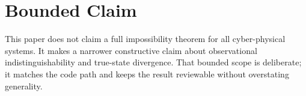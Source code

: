 \documentclass[conference]{IEEEtran}
\begin{document}
\section{Bounded Claim}
This paper does not claim a full impossibility theorem for all cyber-physical systems. It makes a narrower constructive claim about observational indistinguishability and true-state divergence. That bounded scope is deliberate; it matches the code path and keeps the result reviewable without overstating generality.



\end{document}
